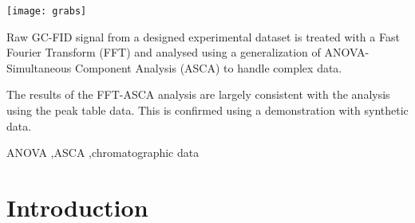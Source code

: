 \documentclass[preprint,12pt]{elsarticle}
\begin{document}
\begin{frontmatter}
\begin{abstract}
\end{abstract}

\begin{graphicalabstract}
\texttt{[image: grabs]}
\end{graphicalabstract}

\begin{highlights}
\item Raw GC-FID signal from a designed experimental dataset is treated with a Fast Fourier Transform (FFT) and analysed using a generalization of ANOVA-Simultaneous Component Analysis (ASCA) to handle complex data.
\item The results of the FFT-ASCA analysis are largely consistent with the analysis using the peak table data. This is confirmed using a demonstration with synthetic data.
\end{highlights}

\begin{keyword}
ANOVA \sep ASCA \sep chromatographic data

\end{keyword}

\end{frontmatter}


\section{Introduction}
\label{sec:sample1}
\end{document}
